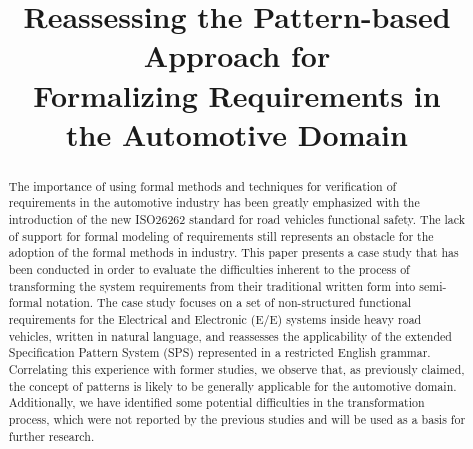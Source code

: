 \documentclass[conference]{IEEEtran}
\begin{document}
%

\title{Reassessing the Pattern-based Approach for \\Formalizing Requirements in \\the Automotive Domain}


\author{
\and
{}
\and
{}
}

\maketitle


\begin{abstract}
The importance of using formal methods and techniques for verification of requirements in the automotive industry has been greatly emphasized with the introduction of the new ISO26262  standard for road vehicles functional safety. The lack of support for formal modeling of requirements still represents an obstacle for the adoption of the formal methods in industry. This paper presents a case study that has been conducted in order to evaluate the difficulties inherent to the process of transforming the system requirements from their traditional written form into semi-formal notation. The case study focuses on a set of non-structured functional requirements for the Electrical and Electronic (E/E) systems inside heavy road vehicles, written in natural language, and reassesses the applicability of the extended Specification Pattern System (SPS) represented in a restricted English grammar. Correlating this experience with former studies, we observe that, as previously claimed, the concept of patterns is likely to be generally applicable for the automotive domain. Additionally, we have identified some potential difficulties in the transformation process, which were not reported by the previous studies and will be used as a basis for further research.
\end{abstract}
\end{document}
